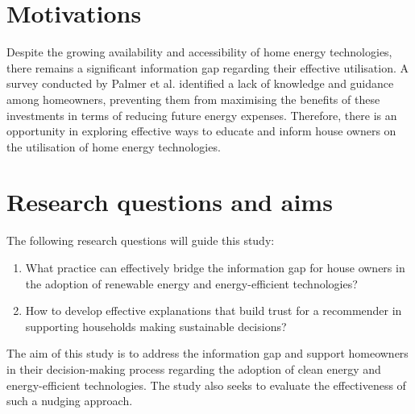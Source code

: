 \section{Motivations}

Despite the growing availability and accessibility of home energy technologies, there remains a significant information gap regarding their effective utilisation. 
A survey conducted by Palmer et al. \cite{informationgap} identified a lack of knowledge and guidance among homeowners, preventing them from maximising the benefits of these investments in terms of reducing future energy expenses. 
Therefore, there is an opportunity in exploring effective ways to educate and inform house owners on the utilisation of home energy technologies. 


\section{Research questions and aims}

The following research questions will guide this study: 
\begin{enumerate}
  \item What practice can effectively bridge the information gap for house owners in the adoption of renewable energy and energy-efficient technologies?
  \item How to develop effective explanations that build trust for a recommender in supporting households making sustainable decisions? 
\end{enumerate}
The aim of this study is to address the information gap and support homeowners in their decision-making process regarding the adoption of clean energy and energy-efficient technologies. 
The study also seeks to evaluate the effectiveness of such a nudging approach. 

